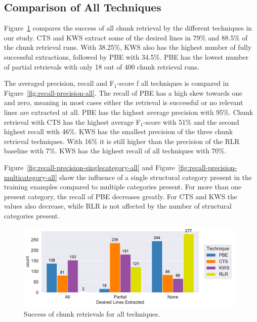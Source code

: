 \documentclass[\myrootdir/main.tex]{subfiles}
\begin{document}
\subsection{Comparison of All Techniques}
Figure~\ref{fig:success-partial-all} compares the success of all chunk retrieval by the different techniques in our study.
CTS and KWS extract some of the desired lines in 79\% and 88.5\% of the chunk retrieval runs.
With 38.25\%, KWS also has the highest number of fully successful extractions, followed by PBE with 34.5\%.
PBE has the lowest number of partial retrievals with only 18 out of 400 chunk retrieval runs.

The averaged precision, recall and F$_{1}$-score f all techniques is compared in Figure~\ref{fig:recall-precision-all}.
The recall of PBE has a high skew towards one and zero, meaning in most cases either the retrieval is successful or no relevant lines are extracted at all.
PBE has the highest average precision with 95\%.
Chunk retrieval with CTS has the highest average F$_{1}$-score with 51\% and the second highest recall with 46\%.
KWS has the smallest precision of the three chunk retrieval techniques.
With 16\% it is still higher than the precision of the RLR baseline with 7\%.
KWS has the highest recall of all techniques with 70\%.

Figure~\ref{fig:recall-precision-singlecategory-all} and Figure~\ref{fig:recall-precision-multicategory-all} show the influence of a single structural category present in the training examples compared to multiple categories present.
For more than one present category, the recall of PBE decreases greatly.
For CTS and KWS the values also decrease, while RLR is not affected by the number of structural categories present.

\begin{figure}[hp]
		\centering
		\includegraphics[width=\textwidth, clip]{img/big-study/success-partial-all.pdf}
		\caption{Success of chunk retrievals for all techniques.}
		\label{fig:success-partial-all}
\end{figure}
\end{document}
